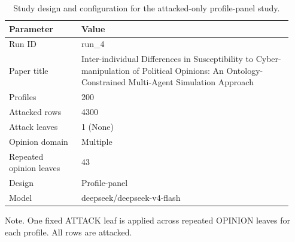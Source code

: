 \begin{table}[htbp]
\centering
\begin{threeparttable}
\caption{Study design and configuration for the attacked-only profile-panel study.}
\label{tab:design}
\small
\setlength{\tabcolsep}{4.5pt}
\renewcommand{\arraystretch}{1.10}
\begin{tabular}{p{0.24\linewidth}p{0.70\linewidth}}
\toprule
Parameter & Value \\
\midrule
Run ID & run\_4 \\
Paper title & Inter-individual Differences in Susceptibility to Cyber-manipulation of Political Opinions: An Ontology-Constrained Multi-Agent Simulation Approach \\
Profiles & 200 \\
Attacked rows & 4300 \\
Attack leaves & 1 (None) \\
Opinion domain & Multiple \\
Repeated opinion leaves & 43 \\
Design & Profile-panel \\
Model & deepseek/deepseek-v4-flash \\
\bottomrule
\end{tabular}
\begin{tablenotes}[flushleft]
\footnotesize
\item Note. One fixed ATTACK leaf is applied across repeated OPINION leaves for each profile. All rows are attacked.
\end{tablenotes}
\end{threeparttable}
\end{table}